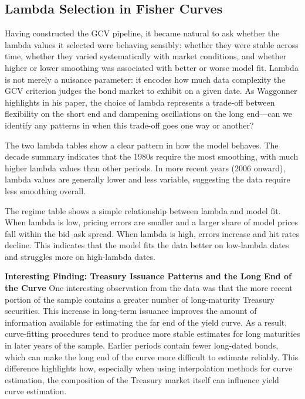 \documentclass{article}
\begin{document}
\subsection{Lambda Selection in Fisher Curves}

Having constructed the GCV pipeline, it became natural to ask whether the lambda values it selected were behaving sensibly: whether they were stable across time, whether they varied systematically with market conditions, and whether higher or lower smoothing was associated with better or worse model fit. Lambda is not merely a nuisance parameter: it encodes how much data complexity the GCV criterion judges the bond market to exhibit on a given date. As Waggonner highlights in his paper, the choice of lambda represents a trade-off between flexibility on the short end and dampening oscillations on the long end—can we identify any patterns in when this trade-off goes one way or another?

The two lambda tables show a clear pattern in how the model behaves. The decade summary indicates that the 1980s require the most smoothing, with much higher lambda values than other periods. In more recent years (2006 onward), lambda values are generally lower and less variable, suggesting the data require less smoothing overall.

The regime table shows a simple relationship between lambda and model fit. When lambda is low, pricing errors are smaller and a larger share of model prices fall within the bid–ask spread. When lambda is high, errors increase and hit rates decline. This indicates that the model fits the data better on low-lambda dates and struggles more on high-lambda dates.

\textbf{Interesting Finding: Treasury Issuance Patterns and the Long End of the Curve} One interesting observation from the data was that the more recent portion of the sample contains a greater number of long-maturity Treasury securities. This increase in long-term issuance improves the amount of information available for estimating the far end of the yield curve. As a result, curve-fitting procedures tend to produce more stable estimates for long maturities in later years of the sample. Earlier periods contain fewer long-dated bonds, which can make the long end of the curve more difficult to estimate reliably. This difference highlights how, especially when using interpolation methods for curve estimation, the composition of the Treasury market itself can influence yield curve estimation.
\end{document}

